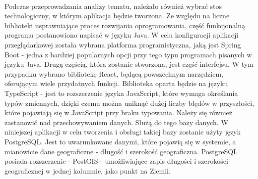 \paragraph{}
Podczas przeprowadzania analizy tematu, należało również wybrać stos technologiczny, w którym aplikacja będzie tworzona. Ze względu na liczne biblioteki usprawniające proces rozwijania oprogramowania, część funkcjonalną programu postanowiono napisać w języku Java. W celu konfiguracji aplikacji przeglądarkowej została wybrana platforma programistyczna, jaką jest Spring Boot - jedna z bardziej popularnych opcji przy tego typu programach pisanych w języku Java. Drugą częścią, która zostanie stworzona, jest część interfejsu. W tym przypadku wybrano bibliotekę React, będącą powszechnym narzędziem, oferującym wiele przydatnych funkcji. Biblioteka oparta będzie na języku TypeScript - jest to rozszerzenie języka JavaScript, które wymaga określania typów zmiennych, dzięki czemu można uniknąć dużej liczby błędów w przyszłości, które pojawiają się w JavaScript przy braku typowania. Należy się również zastanowić nad przechowywaniem danych. Służą do tego bazy danych. W niniejszej aplikacji w celu tworzenia i obsługi takiej bazy zostanie użyty język PostgreSQL. Jest to uwarunkowane danymi, które pojawią się w systemie, a mianowicie dane geograficzne - długość i szerokość geograficzna. PostgreSQL posiada rozszerzenie - PostGIS - umożliwiające zapis długości i szerokości geograficznej w jednej kolumnie, jako punkt na Ziemii.








